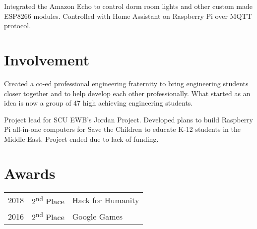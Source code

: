 \documentclass[]{deedy-resume-openfont}
\begin{document}
\begin{minipage}[t]{0.66\textwidth}
\begin{tightemize}
\item Integrated the Amazon Echo to control dorm room lights and other
custom made ESP8266 modules. Controlled with Home Assistant on
Raspberry Pi over MQTT protocol.  
\end{tightemize}
\sectionsep



\section{Involvement}
\begin{tightemize}
\item Created a co-ed professional engineering fraternity to bring
engineering students closer together and to help develop each other
professionally. What started as an idea is now a group of 47 high achieving
engineering students. 
\end{tightemize}
\sectionsep

\begin{tightemize}
\item Project lead for SCU EWB’s Jordan Project. Developed plans to build
Raspberry Pi all-in-one computers for Save the Children to educate K-12
students in the Middle East. Project ended due to lack of funding.
\end{tightemize}
\sectionsep



\section{Awards} 
\begin{tabular}{rll}
2018	     & 2\textsuperscript{nd} Place  & Hack for Humanity\\
2016	     & 2\textsuperscript{nd} Place  & Google Games\\
\end{tabular}
\sectionsep


\end{minipage} 
\end{document}
